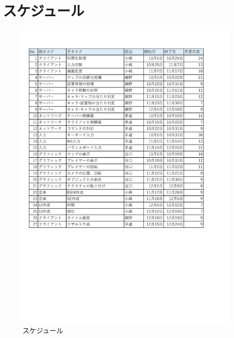 \documentclass{jarticle}
\begin{document}
\section{スケジュール}

\begin{figure}[H]
    \centering
    \label{table:gunt1}
    \caption{スケジュール}
    \includegraphics[scale=0.5]{guntdat.pdf}
\end{figure}
\end{document}
